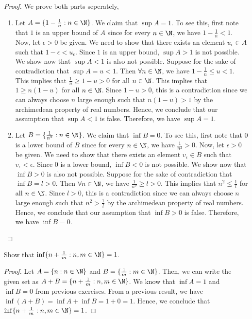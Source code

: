 \documentclass[openany]{book}
\begin{document}
\begin{proof}
    We prove both parts seperately, 
    \begin{enumerate}
        \item Let $A = \{1 - \frac{1}{n} : n \in \N\}$. We claim that $\sup A = 1$. To see this, first note that $1$ is an upper bound of $A$ since for every $n \in \N$, we have $1 - \frac{1}{n} < 1$. Now, let $\epsilon > 0$ be given. We need to show that there exists an element $u_\epsilon \in A$ such that $1 - \epsilon < u_\epsilon$. Since $1$ is an upper bound, $\sup A > 1$ is not possible. We show now that $\sup A < 1$ is also not possible. Suppose for the sake of contradiction that $\sup A = u < 1$. Then $\forall n \in \N$, we have $1 - \frac{1}{n} \leq u < 1$. This implies that $\frac{1}{n} \geq 1 - u > 0$ for all $n \in \N$. This implies that $1 \geq n(1 - u)$ for all $n \in \N$. Since $1 - u > 0$, this is a contradiction since we can always choose $n$ large enough such that $n(1 - u) > 1$ by the archimedean property of real numbers. Hence, we conclude that our assumption that $\sup A < 1$ is false. Therefore, we have $\sup A = 1$.
        \item Let $B = \{\frac{1}{n^2} : n \in \N\}$. We claim that $\inf B = 0$. To see this, first note that $0$ is a lower bound of $B$ since for every $n \in \N$, we have $\frac{1}{n^2} > 0$. Now, let $\epsilon > 0$ be given. We need to show that there exists an element $v_\epsilon \in B$ such that $v_\epsilon < \epsilon$. Since $0$ is a lower bound, $\inf B < 0$ is not possible. We show now that $\inf B > 0$ is also not possible. Suppose for the sake of contradiction that $\inf B = l > 0$. Then $\forall n \in \N$, we have $\frac{1}{n^2} \geq l > 0$. This implies that $n^2 \leq \frac{1}{l}$ for all $n \in \N$. Since $l > 0$, this is a contradiction since we can always choose $n$ large enough such that $n^2 > \frac{1}{l}$ by the archimedean property of real numbers. Hence, we conclude that our assumption that $\inf B > 0$ is false. Therefore, we have $\inf B = 0$.
    \end{enumerate}
\end{proof}
\begin{exercise}
    Show that $\inf \{n + \frac{1}{m} : n, m \in \N\} = 1$.
\end{exercise}
\begin{proof}
    Let $A = \{n : n \in \N\}$ and $B = \{\frac{1}{m} : m \in \N\}$. Then, we can write the given set as $A + B = \{n + \frac{1}{m} : n, m \in \N\}$. We know that $\inf A = 1$ and $\inf B = 0$ from previous exercises. From a previous result, we have $\inf (A + B) = \inf A + \inf B = 1 + 0 = 1$. Hence, we conclude that $\inf \{n + \frac{1}{m} : n, m \in \N\} = 1$.
\end{proof}
\end{document}
